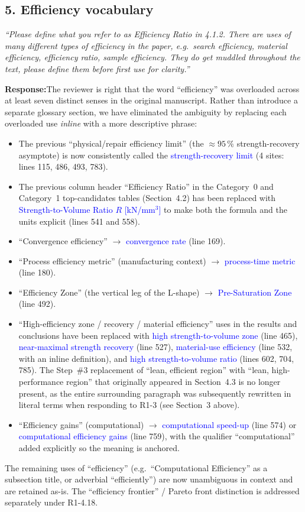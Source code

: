 \documentclass[11pt,a4paper]{article}
\newcommand{\new}[1]{\textcolor{blue}{#1}}
\newcommand{\rev}[1]{\par\noindent\textit{\small #1}\par\smallskip}
\newcommand{\resp}{\par\noindent\textbf{Response:}\space}
\begin{document}
\subsection*{5. Efficiency vocabulary}
\rev{``Please define what you refer to as Efficiency Ratio in 4.1.2. There are uses of many different types of efficiency in the paper, e.g.\ search efficiency, material efficiency, efficiency ratio, sample efficiency. They do get muddled throughout the text, please define them before first use for clarity.''}
\resp The reviewer is right that the word ``efficiency'' was overloaded across at least seven distinct senses in the original manuscript. Rather than introduce a separate glossary section, we have eliminated the ambiguity by replacing each overloaded use \emph{inline} with a more descriptive phrase:
\begin{itemize}
    \item The previous ``physical/repair efficiency limit'' (the $\approx 95\,\%$ strength-recovery asymptote) is now consistently called the \new{strength-recovery limit} (4 sites: lines 115, 486, 493, 783).
    \item The previous column header ``Efficiency Ratio'' in the Category~0 and Category~1 top-candidates tables (Section~4.2) has been replaced with \new{Strength-to-Volume Ratio $R$ [kN/mm$^3$]} to make both the formula and the units explicit (lines 541 and 558).
    \item ``Convergence efficiency'' $\rightarrow$ \new{convergence rate} (line 169).
    \item ``Process efficiency metric'' (manufacturing context) $\rightarrow$ \new{process-time metric} (line 180).
    \item ``Efficiency Zone'' (the vertical leg of the L-shape) $\rightarrow$ \new{Pre-Saturation Zone} (line 492).
    \item ``High-efficiency zone / recovery / material efficiency'' uses in the results and conclusions have been replaced with \new{high strength-to-volume zone} (line 465), \new{near-maximal strength recovery} (line 527), \new{material-use efficiency} (line 532, with an inline definition), and \new{high strength-to-volume ratio} (lines 602, 704, 785). The Step~\#3 replacement of ``lean, efficient region'' with ``lean, high-performance region'' that originally appeared in Section~4.3 is no longer present, as the entire surrounding paragraph was subsequently rewritten in literal terms when responding to R1-3 (see Section~3 above).
    \item ``Efficiency gains'' (computational) $\rightarrow$ \new{computational speed-up} (line 574) or \new{computational efficiency gains} (line 759), with the qualifier ``computational'' added explicitly so the meaning is anchored.
\end{itemize}
The remaining uses of ``efficiency'' (e.g.\ ``Computational Efficiency'' as a subsection title, or adverbial ``efficiently'') are now unambiguous in context and are retained as-is. The ``efficiency frontier'' / Pareto front distinction is addressed separately under R1-4.18.
\end{document}
